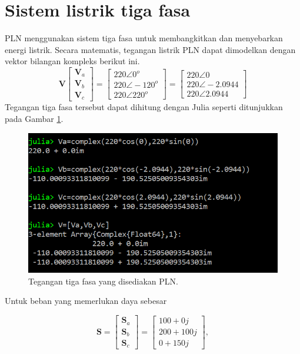 \documentclass[12pt,a4paper]{memoir}
\begin{document}
	\section{Sistem listrik tiga fasa}
	
	PLN menggunakan sistem tiga fasa untuk membangkitkan dan menyebarkan energi listrik. Secara matematis, tegangan listrik PLN dapat dimodelkan dengan vektor bilangan kompleks berikut ini.
	\begin{equation}
	\mathbf{V}
		\begin{bmatrix}
		\mathbf{V}_a\\
		\mathbf{V}_b\\
		\mathbf{V}_c
		\end{bmatrix}=
		\begin{bmatrix}
		220 \angle 0^o \\
		220 \angle -120^o \\
		220 \angle 220^o
		\end{bmatrix}=\begin{bmatrix}
		220\angle 0 \\
		220 \angle -2.0944\\
		220 \angle 2.0944
		\end{bmatrix}
	\end{equation}
Tegangan tiga fasa tersebut dapat dihitung dengan Julia seperti ditunjukkan pada Gambar \ref{fig:complexnumber5}.
\begin{figure}
	\centering
	\includegraphics[width=0.7\linewidth]{images/complexnumber5}
	\caption{Tegangan tiga fasa yang disediakan PLN.}
	\label{fig:complexnumber5}
\end{figure}
	
	Untuk beban yang memerlukan daya sebesar

\begin{equation}
\mathbf{S}=
\begin{bmatrix}
\mathbf{S}_a\\
\mathbf{S}_b\\
\mathbf{S}_c
\end{bmatrix}=
\begin{bmatrix}
100 + 0j \\
200 + 100j \\
0 + 150j
\end{bmatrix},
\end{equation}
\end{document}
